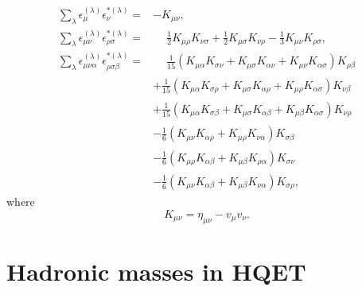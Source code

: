 \begin{subequations}
  \begin{align}
    \sum_\lambda \epsilon^{(\lambda)}_\mu \epsilon^{* (\lambda)}_\nu =& - K_{\mu \nu} , \\
    \sum_\lambda \epsilon^{(\lambda)}_{\mu \nu} \epsilon^{* (\lambda)}_{\rho \sigma} =& \phantom{{}+{}} \frac{1}{2} K_{\mu \rho} K_{\nu \sigma} + \frac{1}{2} K_{\mu \sigma} K_{\nu \rho} - \frac{1}{3} K_{\mu \nu} K_{\rho \sigma} , \\
    \sum_\lambda \epsilon^{(\lambda)}_{\mu \nu \alpha} \epsilon^{* (\lambda)}_{\rho \sigma \beta} =&
    \phantom{{}+{}} \frac{1}{15} \left(K_{\mu \alpha} K_{\sigma \nu} + K_{\mu \sigma} K_{\alpha \nu} + K_{\mu \nu} K_{\alpha \sigma}\right) K_{\rho \beta} \nonumber \\
    \phantom{\sum_\lambda \epsilon^{(\lambda)}_{\mu \nu \alpha} \epsilon^{* (\lambda)}_{\rho \sigma \beta} =}&
    + \frac{1}{15} \left(K_{\mu \alpha} K_{\sigma \rho} + K_{\mu \sigma} K_{\alpha \rho} + K_{\mu \rho} K_{\alpha \sigma}\right) K_{\nu \beta} \nonumber \\
    \phantom{\sum_\lambda \epsilon^{(\lambda)}_{\mu \nu \alpha} \epsilon^{* (\lambda)}_{\rho \sigma \beta} =}&
    + \frac{1}{15} \left(K_{\mu \alpha} K_{\sigma \beta} + K_{\mu \sigma} K_{\alpha \beta} + K_{\mu \beta} K_{\alpha \sigma}\right) K_{\nu \rho} \nonumber \\
    \phantom{\sum_\lambda \epsilon^{(\lambda)}_{\mu \nu \alpha} \epsilon^{* (\lambda)}_{\rho \sigma \beta} =}&
    - \frac{1}{6}  \left( K_{\mu \nu} K_{\alpha \rho} + K_{\mu \rho} K_{\nu \alpha} \right) K_{\sigma \beta} \nonumber \\
    \phantom{\sum_\lambda \epsilon^{(\lambda)}_{\mu \nu \alpha} \epsilon^{* (\lambda)}_{\rho \sigma \beta} =}&
    - \frac{1}{6}  \left( K_{\mu \rho} K_{\alpha \beta} + K_{\mu \beta} K_{\rho \alpha} \right) K_{\sigma \nu} \nonumber \\
    \phantom{\sum_\lambda \epsilon^{(\lambda)}_{\mu \nu \alpha} \epsilon^{* (\lambda)}_{\rho \sigma \beta} =}&
    - \frac{1}{6}  \left(K_{\mu \nu} K_{\alpha \beta} + K_{\mu \beta} K_{\nu \alpha}\right) K_{\sigma \rho} ,
  \end{align}
  \label{eq:polarization_sums}
\end{subequations}
where
\begin{equation}
  K_{\mu \nu} = \eta_{\mu \nu} - v_\mu v_\nu .
\end{equation}

\section{Hadronic masses in HQET}

